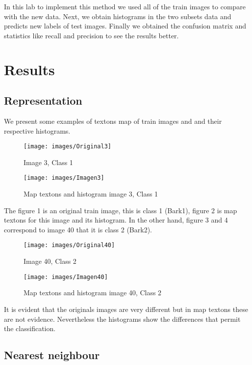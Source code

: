 \documentclass[10pt,twocolumn,letterpaper]{article}
\begin{document}
In this lab to implement this method we used all of the train images to compare with the new data. Next, we obtain histograms in the two subsets data and predicts new labels of test images. Finally we obtained the confusion matrix and statistics like recall and precision to see the results better. 


\section{Results}


\subsection{Representation}

We present some examples of textons map of train images and and their respective histograms. 

\begin{figure}[H] \centering \texttt{[image: images/Original3]}\caption{Image 3, Class 1}\label{Comp}\end{figure}

\begin{figure}[H] \centering \texttt{[image: images/Imagen3]}\caption{Map textons and histogram image 3, Class 1}\label{Comp}\end{figure}

The figure 1 is an original train image, this is class 1 (Bark1), figure 2 is map textons for this image and its histogram. In the other hand, figure 3 and 4 correspond to image 40 that it is class 2 (Bark2). 

\begin{figure}[H] \centering \texttt{[image: images/Original40]}\caption{Image 40, Class 2}\label{Comp}\end{figure}

\begin{figure}[H] \centering \texttt{[image: images/Imagen40]}\caption{Map textons and histogram image 40, Class 2}\label{Comp}\end{figure}


It is evident that the originals images are very different but in map textons these are not evidence. Nevertheless the histograms show the differences that permit the classification. 


\subsection{Nearest neighbour}
\end{document}
